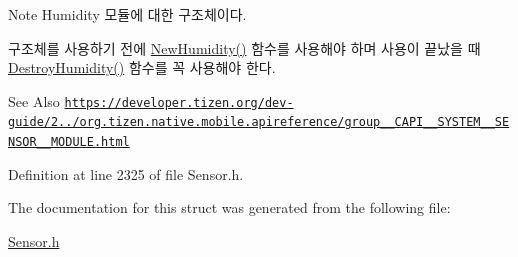\begin{DoxyNote}{Note}
Humidity 모듈에 대한 구조체이다. \par
 구조체를 사용하기 전에 \hyperlink{Sensor_8h_a65b86637b5f2ab7028100fd63b25a6cb}{New\-Humidity()} 함수를 사용해야 하며 사용이 끝났을 때 \hyperlink{Sensor_8h_a229737618125919dd35eac6ef10906dc}{Destroy\-Humidity()} 함수를 꼭 사용해야 한다. 
\end{DoxyNote}
\begin{DoxySeeAlso}{See Also}
\href{https://developer.tizen.org/dev-guide/2.3.0/org.tizen.native.mobile.apireference/group__CAPI__SYSTEM__SENSOR__MODULE.html}{\tt https\-://developer.\-tizen.\-org/dev-\/guide/2../org.\-tizen.\-native.\-mobile.\-apireference/group\-\_\-\-\_\-\-C\-A\-P\-I\-\_\-\-\_\-\-S\-Y\-S\-T\-E\-M\-\_\-\-\_\-\-S\-E\-N\-S\-O\-R\-\_\-\-\_\-\-M\-O\-D\-U\-L\-E.\-html} 
\end{DoxySeeAlso}


Definition at line 2325 of file Sensor.\-h.



The documentation for this struct was generated from the following file\-:\begin{DoxyCompactItemize}
\item 
\hyperlink{Sensor_8h}{Sensor.\-h}\end{DoxyCompactItemize}
